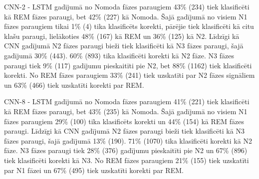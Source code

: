 \documentclass[12pt,paper=A4]{report}
\begin{document}
CNN-2 - LSTM gadījumā no Nomoda fāzes paraugiem 43\% (234) tiek klasificēti kā REM fāzes paraugi, bet 42\% (227) kā Nomoda. 
Šajā gadījumā no visiem N1 fāzes paraugiem tikai 1\% (4) tika klasificēts korekti, 
pārējie tiek klasificēti kā citu klašu paraugi, lielākoties 48\% (167) kā REM un 36\% (125) kā N2. Līdzīgi kā CNN gadījumā N2 fāzes paraugi bieži tiek klasificēti kā N3 fāzes paraugi, šajā gadījumā 30\% (443). 60\% (893) tika klasificēti korekti kā N2 fāze. 
N3 fāzes paraugi tiek 9\% (117) gadījumu pieskaitīti pie N2, bet 88\% (1162) tiek klasificēti korekti. No REM fāzes paraugiem 33\% (241) tiek uzskatīti par N2 fāzes signāliem un 63\% (466) tiek uzskatīti korekti par REM. 

CNN-8 - LSTM gadījumā no Nomoda fāzes paraugiem 41\% (221) tiek klasificēti kā REM fāzes paraugi, bet 43\% (235) kā Nomoda. 
Šajā gadījumā no visiem N1 fāzes paraugiem 29\% (100) tika klasificēts korekti un 44\% (154) kā REM fāzes paraugi. 
Līdzīgi kā CNN gadījumā N2 fāzes paraugi bieži tiek klasificēti kā N3 fāzes paraugi, šajā gadījumā 13\% (190). 71\% (1070) tika klasificēti
korekti kā N2 fāze. 
N3 fāzes paraugi tiek 28\% (376) gadījumu pieskaitīti pie N2 un 67\% (896) tiek klasificēti korekti kā N3.
No REM fāzes paraugiem 21\% (155) tiek uzskatīti par N1 fāzei un 67\% (495) tiek uzskatīti korekti par REM. 
\end{document}
